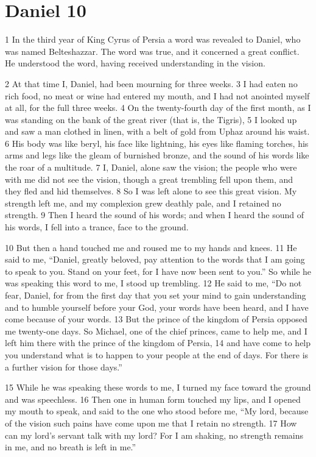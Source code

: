 \chapter{Daniel 10}
\label{ch:daniel10}

1 In the third year of King Cyrus of Persia a word was revealed to Daniel, who 
was named Belteshazzar. The word was true, and it concerned a great conflict. 
He understood the word, having received understanding in the vision.

2 At that time I, Daniel, had been mourning for three weeks. 3 I had eaten no 
rich food, no meat or wine had entered my mouth, and I had not anointed myself 
at all, for the full three weeks. 4 On the twenty-fourth day of the first 
month, as I was standing on the bank of the great river (that is, the Tigris),
5 I looked up and saw a man clothed in linen, with a belt of gold from Uphaz 
around his waist. 6 His body was like beryl, his face like lightning, his eyes 
like flaming torches, his arms and legs like the gleam of burnished bronze, 
and the sound of his words like the roar of a multitude. 7 I, Daniel, alone 
saw the vision; the people who were with me did not see the vision, though a 
great trembling fell upon them, and they fled and hid themselves. 8 So I was 
left alone to see this great vision. My strength left me, and my complexion 
grew deathly pale, and I retained no strength. 9 Then I heard the sound of his 
words; and when I heard the sound of his words, I fell into a trance, face to 
the ground.

10 But then a hand touched me and roused me to my hands and knees. 11 He said 
to me, ``Daniel, greatly beloved, pay attention to the words that I am going 
to speak to you. Stand on your feet, for I have now been sent to you.'' So 
while he was speaking this word to me, I stood up trembling. 12 He said to me, 
``Do not fear, Daniel, for from the first day that you set your mind to gain 
understanding and to humble yourself before your God, your words have been 
heard, and I have come because of your words. 13 But the prince of the kingdom 
of Persia opposed me twenty-one days. So Michael, one of the chief princes, 
came to help me, and I left him there with the prince of the kingdom of Persia,
14 and have come to help you understand what is to happen to your people at 
the end of days. For there is a further vision for those days.''

15 While he was speaking these words to me, I turned my face toward the ground 
and was speechless. 16 Then one in human form touched my lips, and I opened my 
mouth to speak, and said to the one who stood before me, ``My lord, because of 
the vision such pains have come upon me that I retain no strength. 17 How can 
my lord's servant talk with my lord? For I am shaking, no strength remains in 
me, and no breath is left in me.''

